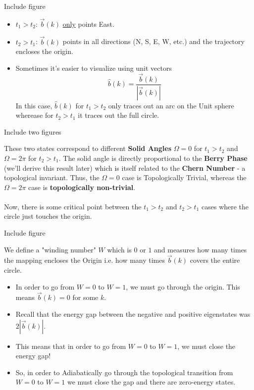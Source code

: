 \documentclass[11pt]{article}
\begin{document}
\begin{center}
  Include figure
\end{center}

\begin{itemize}
  \item $t_1 > t_2$: $\vec{b}(k)$ \underline{only} points East. 
  \item $t_2 > t_1$: $\vec{b}(k)$ points in all directions (N, S, E, W, etc.) and the trajectory encloses the origin.
  \item Sometimes it's easier to visualize using unit vectors $$ \hat{b}(k) = \frac{\vec{b}(k)}{|\vec{b}(k)|} $$ In this case, $\hat{b}(k)$ for $t_1 > t_2$ only traces out an arc on the Unit sphere wherease for $t_2 > t_1$ it traces out the full circle.
\end{itemize}

\begin{center}
  Include two figures
\end{center} These two states correspond to different \textbf{Solid Angles} $\Omega = 0$ for $t_1 > t_2$ and $\Omega = 2\pi$ for $t_2 > t_1$. The solid angle is directly proportional to the \textbf{Berry Phase} (we'll derive this result later) which is itself related to the \textbf{Chern Number} - a topological invariant. Thus, the $\Omega = 0$ case is Topologically Trivial, whereas the $\Omega = 2\pi$ case is \textbf{topologically non-trivial}. 
\\
\\
Now, there is some critical point between the $t_1 > t_2$ and $t_2 > t_1$ cases where the circle just touches the origin.
\begin{center}
  Include figure
\end{center} We define a "winding number" $W$ which is $0$ or $1$ and measures how many times the mapping encloses the Origin i.e. how many times $\vec{b}(k)$ covers the entire circle.

\begin{itemize}
  \item In order to go from $W = 0$ to $W = 1$, we must go through the origin. This means $\vec{b}(k) = 0$ for some $k$. 
  \item Recall that the energy gap between the negative and positive eigenstates was $2|\vec{b}(k)|$. 
  \item This means that in order to go from $W = 0$ to $W = 1$, we must close the energy gap!
  \item So, in order to Adiabatically go through the topological transition from $W = 0$ to $W = 1$ we must close the gap and there are zero-energy states.
\end{itemize}
\end{document}
